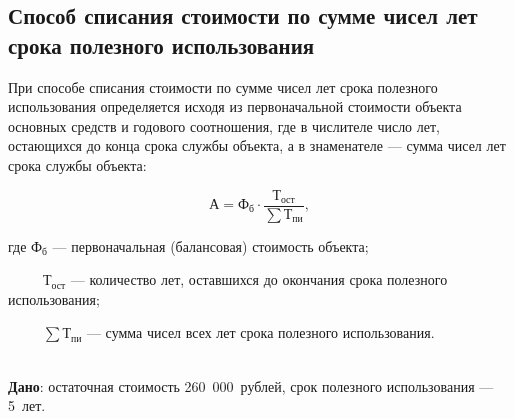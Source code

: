 \subsection{Способ списания стоимости по сумме чисел лет срока полезного
            использования}

\begin{tcolorbox}
При способе списания стоимости по сумме чисел лет срока полезного использования
 определяется исходя из первоначальной стоимости
объекта основных средств и годового соотношения, где в числителе число лет,
остающихся до конца срока службы объекта, а в знаменателе --- сумма чисел лет
срока службы объекта:

\begin{equation}
    \text{А} = \text{Ф}_{\text{б}} \cdot \frac{\text{Т}_{\text{ост}}}{\sum\text{Т}_\text{пи}},
\end{equation}

где $\text{Ф}_{\text{б}}$ --- первоначальная (балансовая) стоимость объекта;

~~~~~$\text{Т}_{\text{ост}}$ --- количество лет, оставшихся до окончания срока
полезного использования;

~~~~~$\sum\text{Т}_\text{пи}$ --- сумма чисел всех лет срока
полезного использования.
\end{tcolorbox}

\begin{example}
    \normalfont
    ~\\
    \textbf{Дано}: остаточная стоимость 260~000~рублей, срок полезного
    использования --- 5~лет.
\end{example}

